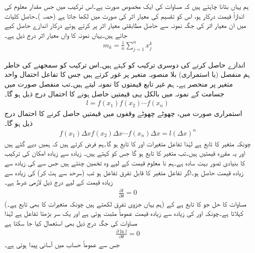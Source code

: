 ہم یہاں بتانا چاہتے ہیں کہ مساوات   کی ایک مخصوص صورت ہے۔اس ترکیب میں جس مقدار معلوم کی اندازاً قیمت درکار ہو، اس کو تقسیم کی معیار اثر کی صورت میں لکھا جاتا ہے (حصہ )۔حاصل کلیات میں ان معیار اثر کی جگہ نمونہ سے حاصل مطابقتی معیار اثر  پر کرتے ہوئے درکار اندازے حاصل کیے جاتے ہیں۔یہاں نمونہ  کا  واں معیار اثر درج ذیل ہے۔
\begin{align*}
m_k=\frac{1}{n}\sum_{j=1}^{n}x_j^k
\end{align*}

اندازے حاصل کرنے کی دوسری ترکیب کو  کہتے ہیں۔اس ترکیب کو سمجھنے کی خاطر ہم منفصل (یا استمراری) بلا منصوبہ متغیر  پر غور کرتے ہیں جس کا تفاعل احتمال واحد  متغیر  پر منحصر ہے۔ ہم  غیر تابع قیمتوں  کا نمونہ لیتے ہیں۔تب منفصل صورت میں  جسامت کے نمونہ میں بالکل یہی قیمتیں حاصل ہونے کا احتمال درج ذیل ہو گا۔
\begin{align}\label{مساوات_شماریات_غیر_تابع_کا_احتمال}
l=f(x_1)f(x_2)\cdots f(x_n)
\end{align}
استمراری صورت میں،  چھوٹے چھوٹے وقفوں   میں قیمتیں حاصل کرنے کا احتمال درج ذیل ہو گا۔
\begin{align}
f(x_1)\Delta x f(x_2)\Delta x\cdots f(x_n)\Delta x=l(\Delta x)^n
\end{align} 
چونکہ  متغیر  کا تابع ہے لہٰذا تفاعل  متغیرات  اور  کا تابع ہو گا۔ہم فرض کرتے ہیں کہ ہمیں  دیے گئے ہیں اور یہ مقررہ قیمتیں ہیں۔تب  متغیر  کا تابع ہو گا جس کو  کہتے ہیں۔ زیادہ سے زیادہ امکان کی ترکیب کا بنیادی تصور بہت سادہ ہے۔ہم نا معلوم قیمت  کے لیے وہ تخمین چنتے ہیں جس سے  کی زیادہ سے زیادہ قیمت حاصل ہو۔اگر تفاعل  متغیر  کا قابل تفرق تفاعل ہو تب (سرحد سے ہٹ کر)  کی زیادہ سے زیادہ قیمت کے لیے درج ذیل  لازمی شرط ہے۔
\begin{align}\label{مساوات_شماریات_زیادہ_سے_زیادہ_الف}
\frac{\partial l}{\partial \theta}=0
\end{align}
(ہم یہاں جزوی تفرق لکھتے ہیں چونکہ  متغیرات  کا بھی تابع ہے۔) مساوات  کا حل جو  کا تابع ہے  کے   کہلاتا ہے۔چونکہ  اور  کی زیادہ سے زیادہ قیمت عموماً مثبت ہوتی ہے اور   یک سر بڑھتا تفاعل ہے لہٰذا مساوات  کی جگہ درج ذیل بھی استعمال کیا جا سکتا ہے
\begin{align}\label{مساوات_شماریات_زیادہ_سے_زیادہ_ب}
\frac{\partial \ln l}{\partial \theta}=0
\end{align}
 جس سے عموماً حساب میں آسانی پیدا ہوتی ہے۔

